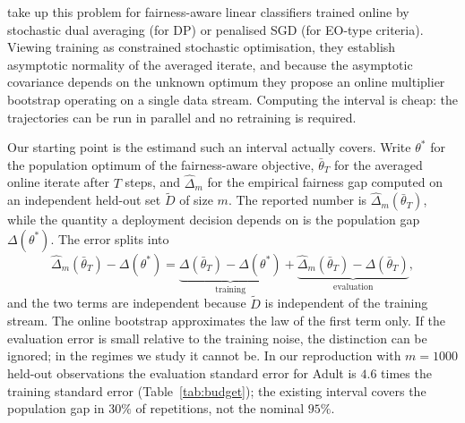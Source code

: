 \documentclass[11pt]{article}
\newcommand{\dhat}{\hat\Delta}
\newcommand{\tbar}{\bar\theta}
\newcommand{\Dt}{\tilde D}
\begin{document}
\citet{roy2026uq} take up this problem for fairness-aware linear classifiers trained online by
stochastic dual averaging (for DP) or penalised SGD (for EO-type criteria).  Viewing training as
constrained stochastic optimisation, they establish asymptotic normality of the averaged iterate, and
because the asymptotic covariance depends on the unknown optimum they propose an online multiplier
bootstrap operating on a single data stream.  Computing the interval is cheap: the trajectories can be run in parallel and no retraining is
required.

Our starting point is the estimand such an interval actually covers.  Write
$\theta^*$ for the population optimum of the fairness-aware objective, $\tbar_T$ for the averaged
online iterate after $T$ steps, and $\dhat_m$ for the empirical fairness gap computed on an
independent held-out set $\Dt$ of size $m$.  The reported number is $\dhat_m(\tbar_T)$, while the
quantity a deployment decision depends on is the population gap $\Delta(\theta^*)$.  The error
splits into
\[
\dhat_m(\tbar_T)-\Delta(\theta^*)
=\underbrace{\Delta(\tbar_T)-\Delta(\theta^*)}_{\text{training}}
+\underbrace{\dhat_m(\tbar_T)-\Delta(\tbar_T)}_{\text{evaluation}} ,
\]
and the two terms are independent because $\Dt$ is independent of the training stream.
The online bootstrap approximates the law of the first term only.  If the evaluation error is small relative to the training noise, the distinction can be ignored; in the regimes we study it cannot be.  In our reproduction with $m=1000$ held-out observations the evaluation standard error for Adult is
$4.6$ times the training standard error (Table~\ref{tab:budget}); the existing interval covers the
population gap in $30\%$ of repetitions, not the nominal $95\%$.
\end{document}
